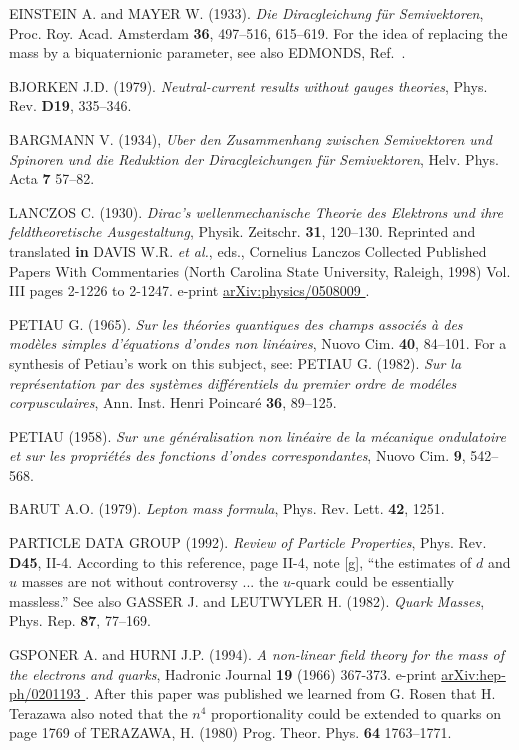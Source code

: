 \documentclass [12pt,a4paper      ]{article}
\begin{document}
\begin{enumerate}
  EINSTEIN  A.  and MAYER W.  (1933).  \emph{Die  Diracgleichung  f\"ur Semivektoren}, Proc. Roy. Acad. Amsterdam   {\bf 36}, 497--516, 615--619. 
For the idea of replacing the mass by a biquaternionic parameter, 
see also EDMONDS, Ref.~\cite{R28}.

  BJORKEN  J.D.  (1979). \emph{Neutral-current results without  gauges theories}, Phys. Rev.   {\bf D19}, 335--346.

  BARGMANN V.  (1934), \emph{Uber den Zusammenhang zwischen Semivektoren und Spinoren und die Reduktion der Diracgleichungen f\"ur Semivektoren}, Helv. Phys. Acta {\bf 7} 57--82.

  LANCZOS  C.  (1930). \emph{Dirac's  wellenmechanische  Theorie  des Elektrons  und  ihre  feldtheoretische   Ausgestaltung}, Physik. 
Zeitschr.   {\bf 31}, 120--130. Reprinted and translated {\bf in} DAVIS W.R. \emph{et al.}, eds., Cornelius Lanczos Collected Published Papers With Commentaries (North Ca\-rolina State University, Raleigh, 1998) Vol. III pages 2-1226 to 2-1247. e-print \underline{ arXiv:physics/0508009 }.

  PETIAU  G.  (1965).  \emph{Sur les th\'eories  quantiques  des  champs associ\'es   \`a   des  mod\`eles  simples  d'\'equations   d'ondes   
non lin\'eaires}, Nuovo Cim.   {\bf 40}, 84--101. For a synthesis of Petiau's work on this subject,  see: PETIAU   G.   (1982). \emph{Sur  la  repr\'esentation  par  des   syst\`emes diff\'erentiels  du premier ordre de mod\'eles  corpusculaires},  Ann. Inst. Henri Poincar\'e   {\bf 36}, 89--125.

  PETIAU  (1958). \emph{Sur une g\'en\'eralisation  non  lin\'eaire  de  la m\'ecanique ondulatoire et sur les propri\'et\'es des fonctions 
d'ondes correspondantes}, Nuovo Cim.   {\bf 9}, 542--568.

 BARUT A.O.  (1979). \emph{Lepton mass formula},  Phys.  Rev. Lett. {\bf 42}, 1251.

  PARTICLE   DATA GROUP (1992). \emph{Review of  Particle  Properties}, Phys. Rev.   {\bf D45}, II-4. According to this reference,  page II-4, note [g], ``the estimates 
of $d$ and $u$ masses are not without controversy ...  the  $u$-quark 
could be essentially massless.''  See also GASSER J. and LEUTWYLER 
H. (1982). \emph{Quark Masses}, Phys. Rep.   {\bf 87}, 77--169.

 GSPONER A. and HURNI J.P. (1994). \emph{A non-linear field theory for the  mass of the electrons and quarks}, Hadronic Journal {\bf19} (1966) 367-373.  e-print \underline{arXiv:hep-ph/0201193  }. After this paper was published we learned from G. Rosen that  H. Terazawa also noted that the $n^4$ proportionality could be extended to quarks on page 1769 of TERAZAWA, H. (1980) Prog. Theor. Phys. {\bf 64} 1763--1771. 


\end{enumerate}
\end{document}
